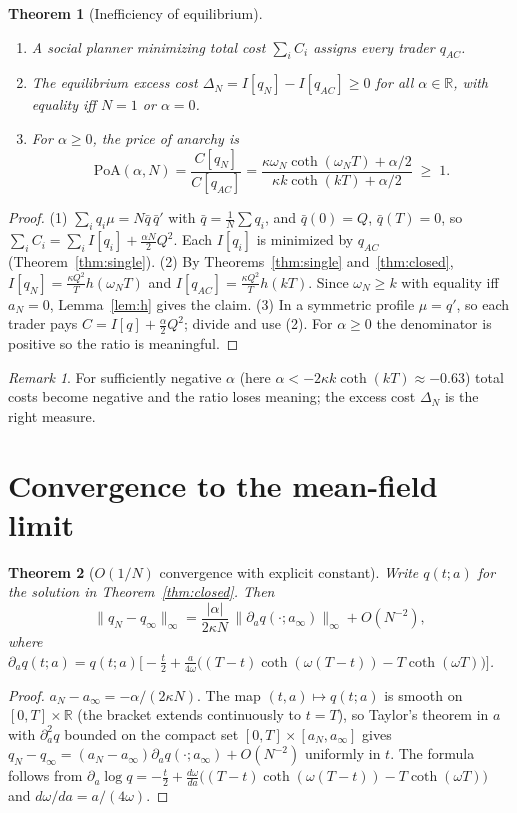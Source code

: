 \documentclass[11pt]{article}
\newtheorem{theorem}{Theorem}
\theoremstyle{definition}
\theoremstyle{remark}
\newtheorem{remark}{Remark}
\newcommand{\R}{\mathbb{R}}
\begin{document}
\begin{theorem}[Inefficiency of equilibrium]\label{thm:poa}
\begin{enumerate}
\item A social planner minimizing total cost $\sum_iC_i$ assigns every trader $q_{AC}$.
\item The equilibrium excess cost $\Delta_N = I[q_N]-I[q_{AC}]\geq0$ for all $\alpha\in\R$,
with equality iff $N=1$ or $\alpha=0$.
\item For $\alpha\geq0$, the price of anarchy is
\[
\mathrm{PoA}(\alpha,N)=\frac{C[q_N]}{C[q_{AC}]}
=\frac{\kappa\omega_N\coth(\omega_NT)+\alpha/2}{\kappa k\coth(kT)+\alpha/2}\;\geq\;1.
\]
\end{enumerate}
\end{theorem}
\begin{proof}
(1) $\sum_iq_i\mu=N\bar q\,\bar q'$ with $\bar q=\frac1N\sum q_i$, and $\bar q(0)=Q$,
$\bar q(T)=0$, so $\sum_iC_i=\sum_iI[q_i]+\tfrac{\alpha N}{2}Q^2$. Each $I[q_i]$ is minimized
by $q_{AC}$ (Theorem~\ref{thm:single}).
(2) By Theorems~\ref{thm:single} and~\ref{thm:closed}, $I[q_N]=\tfrac{\kappa Q^2}{T}h(\omega_NT)$
and $I[q_{AC}]=\tfrac{\kappa Q^2}{T}h(kT)$. Since $\omega_N\geq k$ with equality iff $a_N=0$,
Lemma~\ref{lem:h} gives the claim.
(3) In a symmetric profile $\mu=q'$, so each trader pays $C=I[q]+\tfrac\alpha2Q^2$; divide and
use (2). For $\alpha\geq0$ the denominator is positive so the ratio is meaningful.
\end{proof}

\begin{remark}
For sufficiently negative $\alpha$ (here $\alpha<-2\kappa k\coth(kT)\approx-0.63$) total costs
become negative and the ratio loses meaning; the excess cost $\Delta_N$ is the right measure.
\end{remark}

\section{Convergence to the mean-field limit}
\begin{theorem}[$O(1/N)$ convergence with explicit constant]\label{thm:conv}
Write $q(t;a)$ for the solution in Theorem~\ref{thm:closed}. Then
\[
\big\|q_N-q_\infty\big\|_\infty = \frac{|\alpha|}{2\kappa N}\,\big\|\partial_a q(\cdot;a_\infty)\big\|_\infty + O(N^{-2}),
\]
where
$\partial_a q(t;a) = q(t;a)\Big[-\tfrac t2+\tfrac{a}{4\omega}\big((T-t)\coth(\omega(T-t))-T\coth(\omega T)\big)\Big]$.
\end{theorem}
\begin{proof}
$a_N-a_\infty=-\alpha/(2\kappa N)$. The map $(t,a)\mapsto q(t;a)$ is smooth on
$[0,T]\times\R$ (the bracket extends continuously to $t=T$), so Taylor's theorem in $a$ with
$\partial_a^2q$ bounded on the compact set $[0,T]\times[a_N,a_\infty]$ gives
$q_N-q_\infty=(a_N-a_\infty)\partial_aq(\cdot;a_\infty)+O(N^{-2})$ uniformly in $t$. The formula
follows from $\partial_a\log q=-\tfrac t2+\tfrac{d\omega}{da}\big((T-t)\coth(\omega(T-t))-T\coth(\omega T)\big)$
and $d\omega/da=a/(4\omega)$.
\end{proof}
\end{document}

